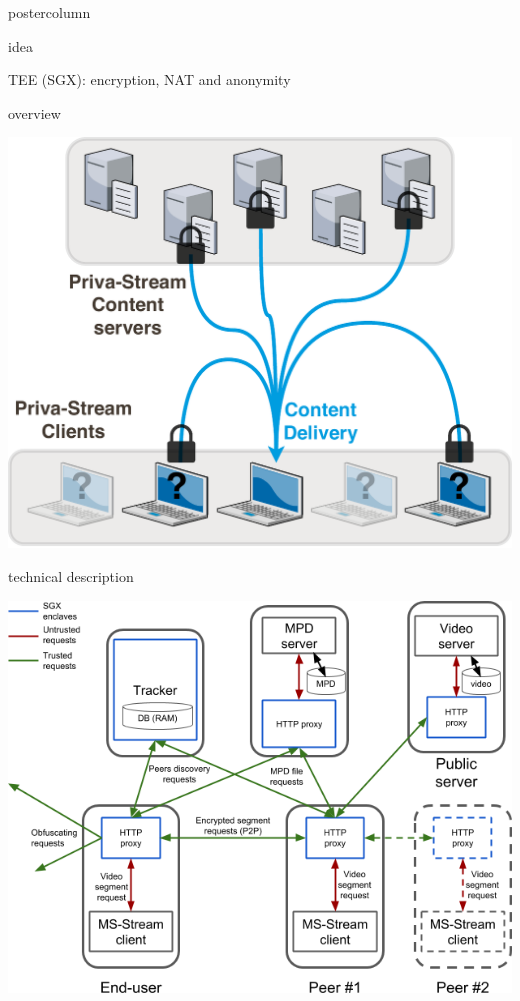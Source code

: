 \begin{frame}
\begin{columns}
\begin{column}{.49\textwidth}
\begin{beamercolorbox}[center,wd=\textwidth]{postercolumn}
\begin{minipage}[T]{.95\textwidth}
{\begin{block}{ idea}
\begin{itemize}
            TEE (SGX): encryption, NAT and anonymity
            
            \end{itemize}
            
            \end{block}
            
            \vfill
            
            \begin{block}{ overview}
            
            \centering
            
            \includegraphics[width=.925\textwidth]{sample/BP.pdf}
            
            \end{block}
            
            \vfill
            
            \begin{block}{ technical description}
            
            \centering
            
            \includegraphics[width=.8\textwidth]{sample/PS-tech.png}
            

\end{block}}
\end{minipage}
\end{beamercolorbox}
\end{column}
\end{columns}
\end{frame}
